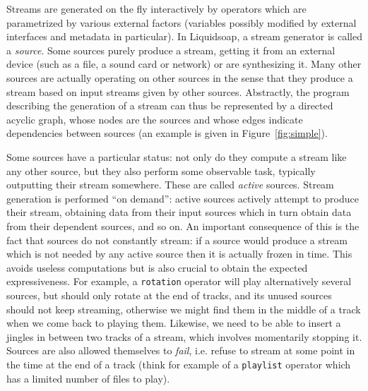 \documentclass{llncs}
\newcommand{\liquidsoap}{Liquidsoap}
\newcommand{\ie}{{i.e.}}
\begin{document}
Streams are generated on the fly interactively by operators which are parametrized by various 
external factors (variables possibly modified by external interfaces and metadata in particular).
In \liquidsoap{}, a stream generator is called a \emph{source}. Some sources
purely produce a stream, getting it from an external device (such as a file, a
sound card or network) or are synthesizing it. Many other sources are actually
operating on other sources in the sense that they produce a stream based on input
streams given by other sources. Abstractly, the program describing the
generation of a stream can thus be represented by a directed acyclic graph,
whose nodes are the sources and whose edges indicate dependencies between
sources (an example is given in Figure~\ref{fig:simple}).


Some sources have a particular status: not only do they compute a stream like any
other source, but they also perform some observable task, typically outputting
their stream somewhere. These are called \emph{active} sources. Stream
generation is performed ``on demand'': active sources actively attempt to
produce their stream, obtaining data from their input sources which in turn
obtain data from their dependent sources, and so on. An important consequence of
this is the fact that sources do not constantly stream: if a source would
produce a stream which is not needed by any active source then it is actually
frozen in time. This avoids useless computations but is also crucial to obtain
the expected expressiveness. For example, a \texttt{rotation} operator will play
alternatively several sources, but should only rotate at the end of tracks, and
its unused sources should not keep streaming, otherwise we might find them in
the middle of a track when we come back to playing them. Likewise, we need to be
able to insert a jingles in between two tracks of a stream, which involves
momentarily stopping it. Sources are also allowed themselves to \emph{fail},
\ie{} refuse to stream at some point in the time at the end of a track (think
for example of a \texttt{playlist} operator which has a limited number of files
to play).
\end{document}
